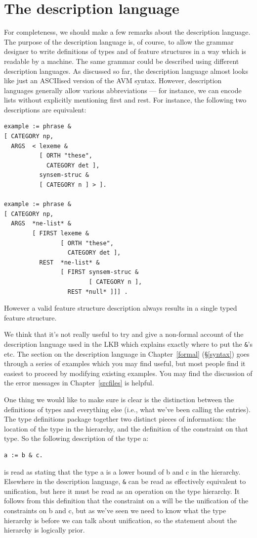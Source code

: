 \documentclass[12pt]{report}
\begin{document}
\section{The description language}

For completeness,
we should make a few remarks about the description language.
The purpose of the description language is, of course,
to allow the grammar designer to write definitions of types and of
feature structures in a way which is readable
by a machine.  The same grammar could be described using
different description languages.  As discussed so far, the description
language almost
looks like just an ASCIIised version of the AVM
syntax.  However,
description languages
generally allow various abbreviations --- for instance, we can
encode lists without explicitly mentioning {\feature first}
and {\feature rest}.
For instance, the following two descriptions are equivalent:
\begin{verbatim}
example := phrase &
[ CATEGORY np,
  ARGS  < lexeme &
          [ ORTH "these",
            CATEGORY det ],
          synsem-struc &
          [ CATEGORY n ] > ].

example := phrase &
[ CATEGORY np,
  ARGS  *ne-list* &
        [ FIRST lexeme &
                [ ORTH "these",
                  CATEGORY det ],
          REST  *ne-list* &
                [ FIRST synsem-struc &
                        [ CATEGORY n ],
                  REST *null* ]]] .
\end{verbatim}
However a valid feature structure description always 
results in a single typed feature structure.

We think that
it's not really useful to try and give a
non-formal account of the description language used in the LKB 
which explains exactly where to put the \verb+&+'s etc.
The section on the description language in Chapter~\ref{formal}
(\S\ref{syntax}) goes through a series of examples
which you may find useful, but most people find it easiest
to proceed by modifying existing examples.  You may find the
discussion of the error messages in Chapter~\ref{srcfiles} is helpful.

One thing we would like to make sure is clear is
the distinction between the definitions of types
and everything else (i.e., what we've been calling the entries).
The type definitions
package together two distinct pieces of information: the
location of the type in the hierarchy, 
and the definition of the
constraint on that type.  So the following description of the type {\type a}:
\begin{verbatim}
a := b & c.
\end{verbatim}
is read as stating that the type {\type a} is a
lower bound of {\type b} and {\type c} in the hierarchy.  
Elsewhere in the description language,
\verb+&+ can be read as effectively equivalent to unification,
but here it must be read as an operation on the type
hierarchy.
It follows from this definition
that the constraint on {\type a} will be the unification of 
the constraints on {\type b} and {\type c}, but as we've seen
we need to know what the type hierarchy is before we can 
talk about unification, so the statement about the hierarchy
is logically prior.
\end{document}
